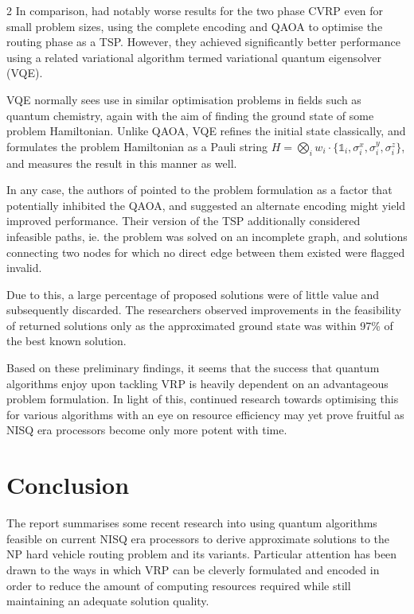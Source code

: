 \documentclass [10pt]{article}
\begin{document}
\begin {multicols}{2}
In comparison, \cite{cvrpqaoa} had notably worse results for the two phase
CVRP even for small problem sizes, using the complete encoding and QAOA to
optimise the routing phase as a TSP. However, they achieved significantly
better performance using a related variational algorithm termed variational
quantum eigensolver (VQE).

VQE normally sees use in similar optimisation problems in fields such as
quantum chemistry, again with the aim of finding the ground state of some
problem Hamiltonian. Unlike QAOA, VQE refines the initial state classically,
and formulates the problem Hamiltonian as a Pauli string $H = \bigotimes_i w_i
\cdot \{\mathbb{1}_i, \sigma^x_i, \sigma^y_i, \sigma^z_i\}$, and measures the
result in this manner as well.

In any case, the authors of \cite{cvrpqaoa} pointed to the problem formulation
as a factor that potentially inhibited the QAOA, and suggested an alternate
encoding might yield improved performance. Their version of the TSP
additionally considered infeasible paths, ie. the problem was solved on an
incomplete graph, and solutions connecting two nodes for which no direct edge
between them existed were flagged invalid.

Due to this, a large percentage of proposed solutions were of little value
and subsequently discarded. The researchers observed improvements in the
feasibility of returned solutions only as the approximated ground state was
within 97\% of the best known solution.

Based on these preliminary findings, it seems that the success that quantum
algorithms enjoy upon tackling VRP is heavily dependent on an advantageous
problem formulation. In light of this, continued research towards optimising
this for various algorithms with an eye on resource efficiency may yet prove
fruitful as NISQ era processors become only more potent with time.

\section {Conclusion}
The report summarises some recent research into using quantum algorithms 
feasible on current NISQ era processors to derive approximate solutions to the
NP hard vehicle routing problem and its variants. Particular attention has been
drawn to the ways in which VRP can be cleverly formulated and encoded in order
to reduce the amount of computing resources required while still maintaining
an adequate solution quality.


\end{multicols}
\end{document}
